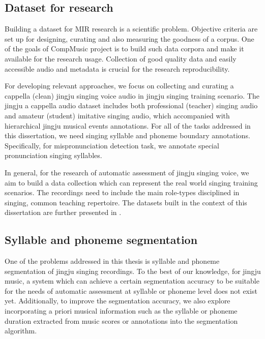 \subsection{Dataset for research}\label{sec:ch3:dataset_research}

Building a dataset for \gls{MIR} research is a scientific problem. Objective criteria are set up for designing, curating and also measuring the goodness of a corpus. One of the goals of CompMusic project is to build such data corpora and make it available for the research usage. Collection of good quality data and easily accessible audio and metadata is crucial for the research reproducibility.

For developing relevant approaches, we focus on collecting and curating a cappella (clean) jingju singing voice audio in jingju singing training scenario. The jingju a cappella audio dataset includes both professional (teacher) singing audio and amateur (student) imitative singing audio, which accompanied with hierarchical jingju musical events annotations. For all of the tasks addressed in this dissertation, we need singing syllable and phoneme boundary annotations. Specifically, for mispronunciation detection task, we annotate special pronunciation singing syllables. 

In general, for the research of automatic assessment of jingju singing voice, we aim to build a data collection which can represent the real world singing training scenarios. The recordings need to include the main role-types disciplined in singing, common teaching repertoire. The datasets built in the context of this dissertation are further presented in .

\subsection{Syllable and phoneme segmentation}\label{sec:ch3:segmentation_formulation}

One of the problems addressed in this thesis is syllable and phoneme segmentation of jingju singing recordings. To the best of our knowledge, for jingju music, a system which can achieve a certain segmentation accuracy to be suitable for the needs of automatic assessment at syllable or phoneme level does not exist yet. Additionally, to improve the segmentation accuracy, we also explore incorporating a priori musical information such as the syllable or phoneme duration extracted from music scores or annotations into the segmentation algorithm.

